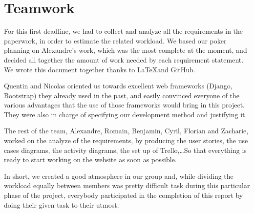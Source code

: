 \section{Teamwork}

For this first deadline, we had to collect and analyze all the requirements in the
paperwork, in order to estimate the related workload. We based our poker planning
on Alexandre's work, which was the most complete at the moment, and decided all together the
amount of work needed by each requirement statement. We wrote this document
together thanks to \LaTeX  and GitHub.\newline

Quentin and Nicolas oriented us towards excellent web frameworks (Django,
Bootstrap) they already used in the past, and easily convinced everyone of the various advantages that the use of those frameworks would bring in this project. They were also in charge of specifying our development method and justifying it.

The rest of the team, Alexandre, Romain, Benjamin, Cyril, Florian and Zacharie, worked on the analyze of the requirements, by producing the user stories, the use cases diagrams, the
activity diagrams, the set up of Trello,\ldots So that everything is ready to start
working on the website as soon as possible. \newline

In short, we created a good atmosphere in our group and, while dividing the workload equally between members was pretty difficult task during this particular phase of the project, everybody participated in the completion of this report by doing their given task to their utmost.